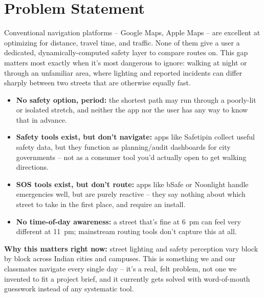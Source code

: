 \documentclass[11pt,a4paper]{article}
\begin{document}
\section{Problem Statement}
Conventional navigation platforms -- Google Maps, Apple Maps --
are excellent at optimizing for distance, travel time, and traffic.
None of them give a user a dedicated, dynamically-computed safety
layer to compare routes on. This gap matters most exactly when
it's most dangerous to ignore: walking at night or through an
unfamiliar area, where lighting and reported incidents can differ
sharply between two streets that are otherwise equally fast.
\begin{itemize}[leftmargin=0.7cm]
    \item \textbf{No safety option, period:} the shortest path may
    run through a poorly-lit or isolated stretch, and neither the
    app nor the user has any way to know that in advance.
    \item \textbf{Safety tools exist, but don't navigate:} apps
    like Safetipin collect useful safety data, but they function as
    planning/audit dashboards for city governments -- not as a
    consumer tool you'd actually open to get walking directions.
    \item \textbf{SOS tools exist, but don't route:} apps like
    bSafe or Noonlight handle emergencies well, but are purely
    reactive -- they say nothing about which street to take in the
    first place, and require an install.
    \item \textbf{No time-of-day awareness:} a street that's fine
    at 6~pm can feel very different at 11~pm; mainstream routing
    tools don't capture this at all.
\end{itemize}

\textbf{Why this matters right now:} street lighting and safety
perception vary block by block across Indian cities and campuses.
This is something we and our classmates navigate every single day
-- it's a real, felt problem, not one we invented to fit a project
brief, and it currently gets solved with word-of-mouth guesswork
instead of any systematic tool.
\end{document}
